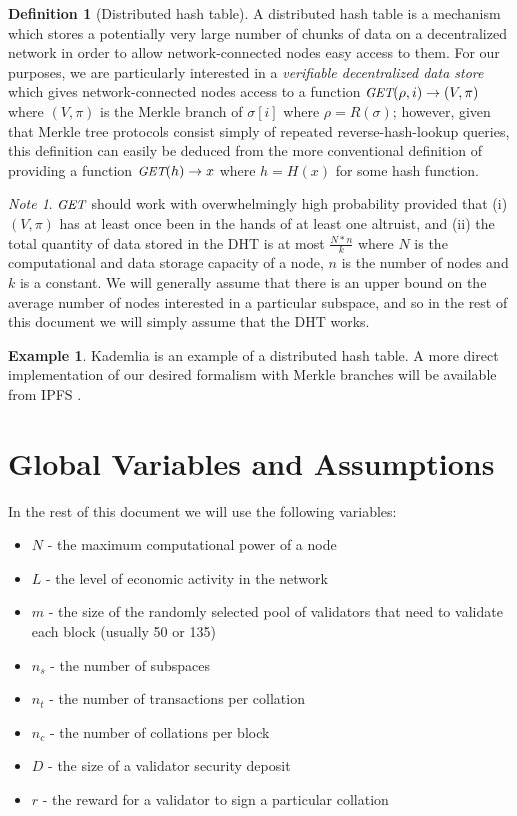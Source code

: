 \documentclass[11pt,a4paper]{article}
\theoremstyle{plain}
\theoremstyle{definition}
\newtheorem{defn}{Definition}[section]
\newtheorem{exmp}{Example}[section]
\theoremstyle{remark}
\newtheorem*{note}{Note}
\newcommand{\makeintoafunction}[1]{\textit{\uppercase{\small #1}}}
\newcommand{\GET}{\makeintoafunction{get}}
\begin{document}
\begin{defn}[Distributed hash table]
A distributed hash table is a mechanism which stores a potentially very large number of chunks of data on a decentralized network in order to allow network-connected nodes easy access to them. For our purposes, we are particularly interested in a \emph{verifiable decentralized data store} which gives network-connected nodes access to a function $\GET(\rho, i) \rightarrow (V, \pi)$ where $(V, \pi)$ is the Merkle branch of $\sigma[i]$ where $\rho = R(\sigma)$; however, given that Merkle tree protocols consist simply of repeated reverse-hash-lookup queries, this definition can easily be deduced from the more conventional definition of providing a function $\GET(h) \rightarrow x$ where $h = H(x)$ for some hash function.
\end{defn}

\begin{note}
$\GET$ should work with overwhelmingly high probability provided that (i) $(V, \pi)$ has at least once been in the hands of at least one altruist, and (ii) the total quantity of data stored in the DHT is at most $\frac{N * n}{k}$ where $N$ is the computational and data storage capacity of a node, $n$ is the number of nodes and $k$ is a constant. We will generally assume that there is an upper bound on the average number of nodes interested in a particular subspace, and so in the rest of this document we will simply assume that the DHT works.
\end{note}

\begin{exmp}
Kademlia \cite{kademlia} is an example of a distributed hash table. A more direct implementation of our desired formalism with Merkle branches will be available from IPFS \cite{ipfs}.
\end{exmp}

\section{Global Variables and Assumptions}

In the rest of this document we will use the following variables:

\begin{itemize}
\item
$N$ - the maximum computational power of a node
\item
$L$ - the level of economic activity in the network
\item
$m$ - the size of the randomly selected pool of validators that need to validate each block (usually 50 or 135)
\item
$n_s$ - the number of subspaces
\item
$n_t$ - the number of transactions per collation
\item
$n_c$ - the number of collations per block
\item
$D$ - the size of a validator security deposit
\item
$r$ - the reward for a validator to sign a particular collation
\end{itemize}
\end{document}
